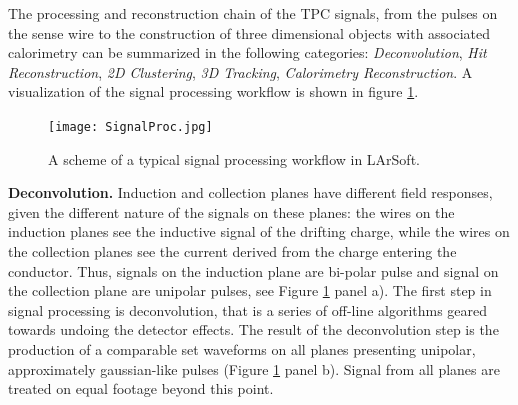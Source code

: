 \documentclass[aps,prl,twocolumn,showpacs,superscriptaddress,groupedaddress]{revtex4}  %
\begin{document}
The processing and reconstruction chain of the TPC signals, from the pulses on the sense wire to the construction of three dimensional objects with associated calorimetry can be summarized in the following categories: \emph{Deconvolution}, \emph{Hit Reconstruction}, \emph{2D Clustering}, \emph{3D Tracking}, \emph{Calorimetry Reconstruction}.  A visualization of the signal processing workflow is shown in figure \ref{fig:SignalProc}.\\

\begin{figure}[hbpt]
\centering
\texttt{[image: SignalProc.jpg]}
\caption{A scheme of a typical signal processing workflow in LArSoft.}
\label{fig:SignalProc}
\end{figure}

\textbf{Deconvolution.} Induction and collection planes have different field responses, given the different nature of the signals on these planes: the wires on the induction planes see the inductive signal of the drifting charge, while the wires on the collection planes see the current derived from the charge entering the conductor. Thus, signals on the induction plane are bi-polar pulse and signal on the collection plane are unipolar pulses, see Figure \ref{fig:SignalProc} panel a). The first step in signal processing is deconvolution, that is a series of off-line algorithms geared towards undoing the detector effects. The result of the deconvolution step is  the production of  a comparable set waveforms on all planes presenting unipolar, approximately gaussian-like pulses (Figure \ref{fig:SignalProc} panel b). Signal from all planes are treated on equal footage beyond this point.\\
\end{document}
